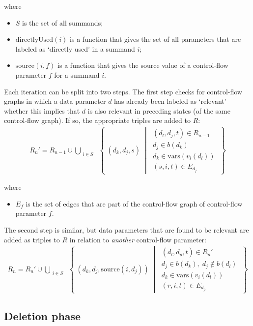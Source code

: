 where

\begin{itemize}
\item $S$ is the set of all summands;
\item $\text{directlyUsed}(i)$ is a function that gives the set of all parameters that are labeled as `directly used' in a summand $i$;
\item $\text{source}(i, f)$ is a function that gives the source value of a control-flow parameter $f$ for a summand $i$.
\end{itemize}

Each iteration can be split into two steps.
The first step checks for control-flow graphs in which a data parameter $d$ has already been labeled as `relevant' whether this implies that $d$ is also relevant in preceding states (of the same control-flow graph).
If so, the appropriate triples are added to $R$:
\begin{align*}
R_{n}{'} = R_{n-1} \cup \bigcup\limits_{\substack{i \in S}}^{} \;\left\{\; (d_k, d_j, s) \;\middle|\; \substack{(d_l, d_j, t) \in R_{n-1} \\ d_j \in b(d_k) \\ d_k \in \text{vars}(v_i(d_l)) \\ (s, i, t) \in E_{d_j}} \;\right\}
\end{align*}

where

\begin{itemize}
\item $E_{f}$ is the set of edges that are part of the control-flow graph of control-flow parameter $f$.
\end{itemize}

The second step is similar, but data parameters that are found to be relevant are added as triples to $R$ in relation to \emph{another} control-flow parameter:
\begin{align*}
R_{n} = R_{n}{'} \cup \bigcup\limits_{\substack{i \in S}}^{} \;\left\{\; (d_k, d_j, \text{source}(i, d_j)) \;\middle|\; \substack{(d_l, d_p, t) \in R_{n}{'} \\ d_j \in b(d_k),\; d_j \notin b(d_l) \\ d_k \in \text{vars}(v_i(d_l)) \\ (r, i, t) \in E_{d_p}} \;\right\}
\end{align*}

\subsection{Deletion phase}

